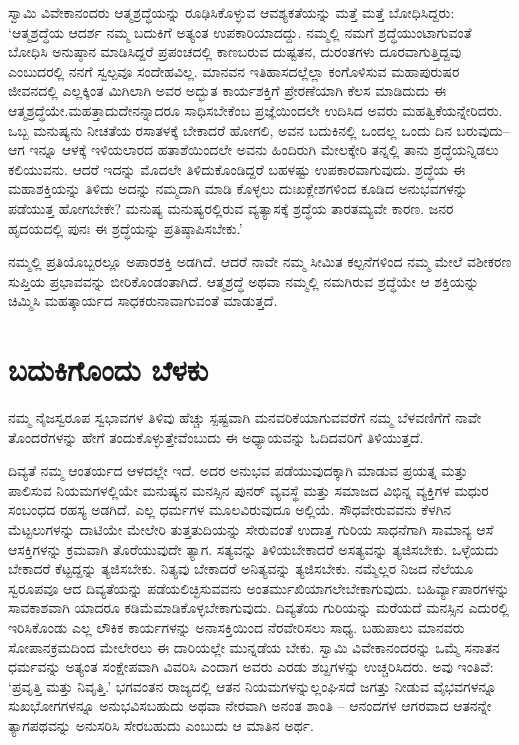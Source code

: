 ಸ್ವಾಮಿ ವಿವೇಕಾನಂದರು ಆತ್ಮಶ್ರದ್ಧೆಯನ್ನು ರೂಢಿಸಿಕೊಳ್ಳುವ ಆವಶ್ಯಕತೆಯನ್ನು ಮತ್ತೆ ಮತ್ತೆ ಬೋಧಿಸಿದ್ದರು: ‘ಆತ್ಮಶ್ರದ್ಧೆಯ ಆದರ್ಶ ನಮ್ಮ ಬದುಕಿಗೆ ಅತ್ಯಂತ ಉಪಕಾರಿಯಾದದ್ದು. ನಮ್ಮಲ್ಲಿ ನಮಗೆ ಶ್ರದ್ಧೆಯುಂಟಾಗುವಂತೆ ಬೋಧಿಸಿ ಅನುಷ್ಠಾನ ಮಾಡಿಸಿದ್ದರೆ ಪ್ರಪಂಚದಲ್ಲಿ ಕಾಣಬರುವ ದುಷ್ಟತನ, ದುರಂತಗಳು ದೂರವಾಗುತ್ತಿದ್ದವು ಎಂಬುದರಲ್ಲಿ ನನಗೆ ಸ್ವಲ್ಪವೂ ಸಂದೇಹವಿಲ್ಲ. ಮಾನವನ ಇತಿಹಾಸದಲ್ಲೆಲ್ಲಾ ಕಂಗೊಳಿಸುವ ಮಹಾಪುರುಷರ ಜೀವನದಲ್ಲಿ ಎಲ್ಲಕ್ಕಿಂತ ಮಿಗಿಲಾಗಿ ಅವರ ಅದ್ಭುತ ಕಾರ್ಯಶಕ್ತಿಗೆ ಪ್ರೇರಣೆಯಾಗಿ ಕೆಲಸ ಮಾಡಿದುದು ಈ ಆತ್ಮಶ್ರದ್ಧೆಯೇ.\break ಮಹತ್ತಾದುದೇನನ್ನಾದರೂ ಸಾಧಿಸಬೇಕೆಂಬ ಪ್ರಜ್ಞೆಯಿಂದಲೇ ಉದಿಸಿದ ಅವರು ಮಹತ್ವಿಕೆ\-ಯನ್ನೇ\-ರಿದರು. ಒಬ್ಬ ಮನುಷ್ಯನು ನೀಚತೆಯ ರಸಾತಳಕ್ಕೆ ಬೇಕಾದರೆ ಹೋಗಲಿ, ಅವನ ಬದುಕಿನಲ್ಲಿ ಒಂದಲ್ಲ ಒಂದು ದಿನ ಬರುವುದು–ಆಗ ಇನ್ನೂ ಆಳಕ್ಕೆ ಇಳಿಯಲಾರದ ಹತಾಶೆಯಿಂದಲೇ ಅವನು ಹಿಂದಿರುಗಿ ಮೇಲಕ್ಕೇರಿ ತನ್ನಲ್ಲಿ ತಾನು ಶ್ರದ್ಧೆಯನ್ನಿಡಲು ಕಲಿಯುವನು. ಆದರೆ ಇದನ್ನು ಮೊದಲೇ ತಿಳಿದುಕೊಂಡಿದ್ದರೆ ಬಹಳಷ್ಟು ಉಪಕಾರವಾಗುವುದು. ಶ್ರದ್ಧೆಯ ಈ ಮಹಾಶಕ್ತಿಯನ್ನು ತಿಳಿದು ಅದನ್ನು ನಮ್ಮದಾಗಿ ಮಾಡಿ ಕೊಳ್ಳಲು ದುಃಖಕ್ಲೇಶಗಳಿಂದ ಕೂಡಿದ ಅನುಭವಗಳನ್ನು ಪಡೆಯುತ್ತ ಹೋಗಬೇಕೇ? ಮನುಷ್ಯ ಮನುಷ್ಯರಲ್ಲಿರುವ ವ್ಯತ್ಯಾಸಕ್ಕೆ ಶ್ರದ್ಧೆಯ ತಾರತಮ್ಯವೇ ಕಾರಣ. ಜನರ ಹೃದಯದಲ್ಲಿ ಪುನಃ ಈ ಶ್ರದ್ಧೆಯನ್ನು ಪ್ರತಿಷ್ಠಾಪಿಸಬೇಕು.’

ನಮ್ಮಲ್ಲಿ ಪ್ರತಿಯೊಬ್ಬರಲ್ಲೂ ಅಪಾರಶಕ್ತಿ ಅಡಗಿದೆ. ಆದರೆ ನಾವೇ ನಮ್ಮ ಸೀಮಿತ ಕಲ್ಪನೆಗಳಿಂದ ನಮ್ಮ ಮೇಲೆ ವಶೀಕರಣ ಸುಪ್ತಿಯ ಪ್ರಭಾವವನ್ನು ಬೀರಿಕೊಂಡಂತಾಗಿದೆ. ಆತ್ಮಶ್ರದ್ಧೆ ಅಥವಾ ನಮ್ಮಲ್ಲಿ ನಮಗಿರುವ ಶ್ರದ್ಧೆಯೇ ಆ ಶಕ್ತಿಯನ್ನು ಚಿಮ್ಮಿಸಿ ಮಹತ್ಕಾರ್ಯದ ಸಾಧಕರು\break ನಾವಾಗುವಂತೆ ಮಾಡುತ್ತದೆ.

\newpage


\section*{ಬದುಕಿಗೊಂದು ಬೆಳಕು}

\vskip -5pt

ನಮ್ಮ ನೈಜಸ್ವರೂಪ ಸ್ವಭಾವಗಳ ತಿಳಿವು ಹೆಚ್ಚು ಸ್ಪಷ್ಟವಾಗಿ ಮನವರಿಕೆಯಾಗುವವರೆಗೆ ನಮ್ಮ ಬೆಳವಣಿಗೆಗೆ ನಾವೇ ತೊಂದರೆಗಳನ್ನು ಹೇಗೆ ತಂದುಕೊಳ್ಳುತ್ತೇವೆಂಬುದು ಈ ಅಧ್ಯಾಯವನ್ನು ಓದಿದವರಿಗೆ ತಿಳಿಯುತ್ತದೆ.

ದಿವ್ಯತೆ ನಮ್ಮ ಆಂತರ್ಯದ ಆಳದಲ್ಲೇ ಇದೆ. ಅದರ ಅನುಭವ ಪಡೆಯುವುದಕ್ಕಾಗಿ ಮಾಡುವ ಪ್ರಯತ್ನ ಮತ್ತು ಪಾಲಿಸುವ ನಿಯಮಗಳಲ್ಲಿಯೇ ಮನುಷ್ಯನ ಮನಸ್ಸಿನ ಪುನರ್ ವ್ಯವಸ್ಥೆ ಮತ್ತು ಸಮಾಜದ ವಿಭಿನ್ನ ವ್ಯಕ್ತಿಗಳ ಮಧುರ ಸಂಬಂಧದ ರಹಸ್ಯ ಅಡಗಿದೆ. ಎಲ್ಲ ಧರ್ಮಗಳ ಮೂಲವಿರುವುದೂ ಅಲ್ಲಿಯೆ. ಸೌಧವೇರುವವನು ಕೆಳಗಿನ ಮೆಟ್ಟಲುಗಳನ್ನು ದಾಟಿಯೇ ಮೇಲೇರಿ ತುತ್ತತುದಿಯನ್ನು ಸೇರುವಂತೆ ಉದಾತ್ತ ಗುರಿಯ ಸಾಧನೆಗಾಗಿ ಸಾಮಾನ್ಯ ಆಸೆ ಆಸಕ್ತಿಗಳನ್ನು ಕ್ರಮವಾಗಿ ತೊರೆಯುವುದೇ ತ್ಯಾಗ. ಸತ್ಯವನ್ನು ತಿಳಿಯಬೇಕಾದರೆ ಅಸತ್ಯವನ್ನು ತ್ಯಜಿಸಬೇಕು. ಒಳ್ಳೆಯದು ಬೇಕಾದರೆ ಕೆಟ್ಟದ್ದನ್ನು ತ್ಯಜಿಸಬೇಕು. ನಿತ್ಯವು ಬೇಕಾದರೆ ಅನಿತ್ಯವನ್ನು ತ್ಯಜಿಸಬೇಕು. ನಮ್ಮೆಲ್ಲರ ನಿಜದ ನೆಲೆಯೂ ಸ್ವರೂಪವೂ ಆದ ದಿವ್ಯತೆಯನ್ನು ಪಡೆಯಲಿಚ್ಛಿಸುವವನು ಅಂತರ್ಮುಖಿಯಾಗಲೇಬೇಕಾಗುವುದು. ಬಹಿರ್ವ್ಯಾಪಾರಗಳನ್ನು ಸಾವಕಾಶವಾಗಿ ಯಾದರೂ ಕಡಿಮೆಮಾಡಿಕೊಳ್ಳಬೇಕಾಗುವುದು. ದಿವ್ಯತೆಯ ಗುರಿಯನ್ನು ಮರೆಯದೆ ಮನಸ್ಸಿನ ಎದುರಲ್ಲಿ ಇರಿಸಿಕೊಂಡು ಎಲ್ಲ ಲೌಕಿಕ ಕಾರ್ಯಗಳನ್ನು ಅನಾಸಕ್ತಿಯಿಂದ ನೆರವೇರಿಸಲು ಸಾಧ್ಯ. ಬಹುಪಾಲು ಮಾನವರು ಸೋಪಾನಕ್ರಮದಿಂದ ಮೇಲೇರಲು ಈ ದಾರಿಯಲ್ಲೇ ಮುನ್ನಡೆಯ ಬೇಕು. ಸ್ವಾಮಿ ವಿವೇಕಾನಂದರನ್ನು ಒಮ್ಮೆ ಸನಾತನ ಧರ್ಮವನ್ನು ಅತ್ಯಂತ ಸಂಕ್ಷೇಪವಾಗಿ ವಿವರಿಸಿ ಎಂದಾಗ ಅವರು ಎರಡು ಶಬ್ದಗಳನ್ನು ಉಚ್ಚರಿಸಿದರು. ಅವು ಇಂತಿವೆ: ‘ಪ್ರವೃತ್ತಿ ಮತ್ತು ನಿವೃತ್ತಿ.’ ಭಗವಂತನ ರಾಜ್ಯದಲ್ಲಿ ಆತನ ನಿಯಮಗಳನ್ನುಲ್ಲಂಘಿಸದೆ ಜಗತ್ತು ನೀಡುವ ವೈಭವಗಳನ್ನೂ ಸುಖಭೋಗಗಳನ್ನೂ ಅನುಭವಿಸಬಹುದು ಅಥವಾ ನೇರವಾಗಿ ಅನಂತ ಶಾಂತಿ – ಆನಂದಗಳ ಆಗರವಾದ ಆತನನ್ನೇ ತ್ಯಾಗಪಥವನ್ನು ಅನುಸರಿಸಿ ಸೇರಬಹುದು ಎಂಬುದು ಆ ಮಾತಿನ ಅರ್ಥ.

